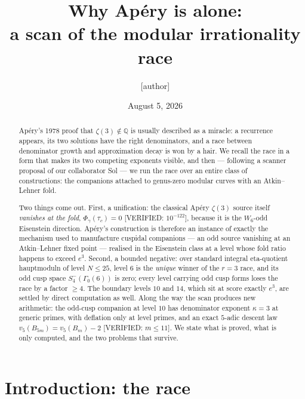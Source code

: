 \documentclass[11pt,reqno]{amsart}
\theoremstyle{plain}
\theoremstyle{definition}
\theoremstyle{remark}
\newcommand{\Q}{\mathbb{Q}}
\newcommand{\Ga}{\Gamma_0}
\newcommand{\VerifiedR}[1]{\textup{\textsf{[VERIFIED: #1]}}}
\begin{document}
\title[Why Ap\'ery is alone]{Why Ap\'ery is alone:\\ a scan of the modular irrationality race}

\author{[author]}

\date{August 5, 2026}

\begin{abstract}
Ap\'ery's 1978 proof that $\zeta(3)\notin\Q$ is usually described as a
miracle: a recurrence appears, its two solutions have the right
denominators, and a race between denominator growth and approximation
decay is won by a hair. We recall the race in a form that makes its two
competing exponents visible, and then --- following a scanner proposal of
our collaborator Sol --- we run the race over an entire class of
constructions: the companions attached to genus-zero modular curves with
an Atkin--Lehner fold.

Two things come out. First, a unification: the classical Ap\'ery
$\zeta(3)$ source itself \emph{vanishes at the fold},
$\Phi_\gamma(\tau_c)=0$ \VerifiedR{$10^{-122}$}, because it is the
$W_6$-odd Eisenstein direction. Ap\'ery's construction is therefore an
instance of exactly the mechanism used to manufacture cuspidal
companions --- an odd source vanishing at an Atkin--Lehner fixed point ---
realised in the Eisenstein class at a level whose fold ratio happens to
exceed $e^3$. Second, a bounded negative: over standard integral
eta-quotient hauptmoduln of level $N\le 25$, level $6$ is the
\emph{unique} winner of the $r=3$ race, and its odd cusp space
$S_4^-(\Ga(6))$ is zero; every level carrying odd cusp forms loses the
race by a factor $\ge 4$. The boundary levels $10$ and $14$, which sit at
score exactly $e^3$, are settled by direct computation as well. Along the
way the scan produces new arithmetic: the odd-cusp companion at level
$10$ has denominator exponent $\kappa=3$ at generic primes, with
deflation only at level primes, and an exact $5$-adic descent law
$v_5(B_{5m})=v_5(B_m)-2$ \VerifiedR{$m\le11$}. We state what is proved,
what is only computed, and the two problems that survive.
\end{abstract}

\maketitle

\tableofcontents

\section{Introduction: the race}
\label{sec:intro}
\end{document}
